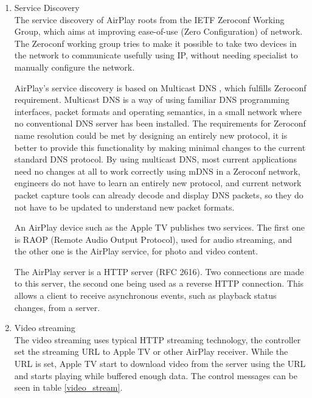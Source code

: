\begin{enumerate}
\item Service Discovery \\
The service discovery of AirPlay roots from the IETF Zeroconf Working Group,
which aims at improving ease-of-use (Zero Configuration) of network. The
Zeroconf working group tries to make it possible to take two devices in the
network to communicate usefully using IP, without needing specialist to manually
configure the network. 

AirPlay's service discovery is based on Multicast DNS \cite{multicastdns}, which
fulfills Zeroconf requirement. Multicast DNS is a way of using familiar DNS
programming interfaces, packet formats and operating semantics, in a small
network where no conventional DNS server has been installed. The requirements
for Zeroconf name resolution could be met by designing an entirely new
protocol, it is better to provide this functionality by making minimal changes
to the current standard DNS protocol. By using multicast DNS, most current
applications need no changes at all to work correctly using mDNS in a Zeroconf network,
engineers do not have to learn an entirely new protocol, and current network
packet capture tools can already decode and display DNS packets, so they do not
have to be updated to understand new packet formats.

An AirPlay device such as the Apple TV publishes two services. The first one is
RAOP (Remote Audio Output Protocol), used for audio streaming, and the other
one is the AirPlay service, for photo and video content.

The AirPlay server is a HTTP server (RFC 2616). Two connections are made to this
server, the second one being used as a reverse HTTP connection. This allows a
client to receive asynchronous events, such as playback status changes, from a
server.
\item Video streaming \\
The video streaming uses typical HTTP streaming technology, the controller set
the streaming URL to Apple TV or other AirPlay receiver. While the URL is set,
Apple TV start to download video from the server using the URL and starts
playing while buffered enough data. The control messages can be seen in
table \ref{video_stream}.


\end{enumerate}

